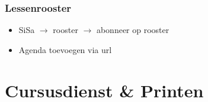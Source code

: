 \begin{frame}
	\frametitle{Lessenrooster}
	
	\vspace{0.5cm}
	
    \begin{itemize}
    	  \item SiSa $\rightarrow$ rooster $\rightarrow$ abonneer op rooster
      \item Agenda toevoegen via url
    \end{itemize}
    
    
\end{frame}

\section{Cursusdienst \& Printen}
